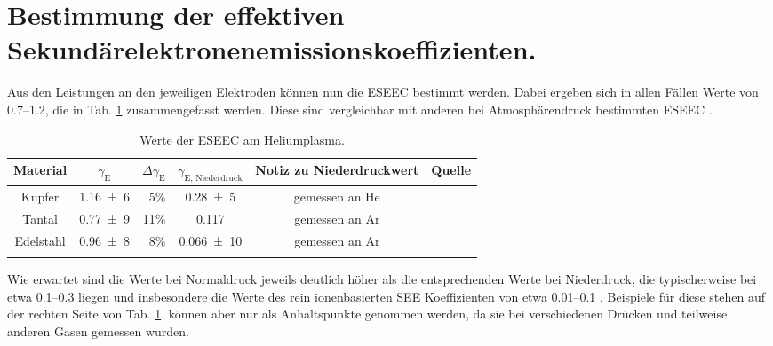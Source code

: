 \section{Bestimmung  der effektiven Sekundärelektronenemissionskoeffizienten.}

Aus den Leistungen an den jeweiligen Elektroden können nun die ESEEC bestimmt werden. Dabei ergeben sich in allen Fällen Werte von \numrange{0,7}{1,2}, die in Tab. \ref{tab:ESEEC} zusammengefasst werden. Diese sind vergleichbar mit anderen bei Atmosphärendruck bestimmten ESEEC \cite{hansenConventionalNonconventionalDiagnostics2022}. 

\begin{table}[thb]
	\centering
	\begin{tabular}{ccr|ccc}
		
		{Material} &{$ \gamma_\text{E} $}& \multicolumn{1}{l}{$ \Delta\gamma_\text{E} $} & {$ \gamma_\text{E, Niederdruck} $} & {Notiz zu Niederdruckwert} & {Quelle} \\
		\toprule
		
		{Kupfer}      & \num{1,16(6)} & 5\% & \num{0,28(5)} & gemessen an He & \cite{guntherschulzeElektronenablosungDurchStoss1930}  \\
		{Tantal}      & \num{0,77(9)} & 11\% & \num{0,117} & gemessen an Ar & \cite{oechsnerElectronYieldsClean1978} \\
		{Edelstahl}      & \num{0,96(8)} & 8\% & \num{0,066(10)} & gemessen an Ar & \cite{dakshaComputationallyAssistedSpectroscopic2016}  \\
		\addlinespace
		
	\end{tabular}
	
	\caption{Werte der ESEEC am Heliumplasma.}
	\label{tab:ESEEC}
\end{table}

Wie erwartet sind die Werte bei Normaldruck jeweils deutlich höher als die entsprechenden Werte bei Niederdruck, die typischerweise bei etwa \numrange{0,1}{0,3} liegen und insbesondere die Werte des rein ionenbasierten SEE Koeffizienten von etwa \numrange{0,01}{0,1}  \cite{liebermanPrinciplesPlasmaDischarges2005,haaseDynamicDeterminationSecondary2018,bohmRetardingfieldAnalyzerMeasurements1993,toliasSecondaryElectronEmission2014, marcakNoteIoninducedSecondary2015,dakshaComputationallyAssistedSpectroscopic2016,pamperinIoninducedSecondaryElectron2018,dakshaMaterialDependentModeling2019,oechsnerElectronYieldsClean1978,guntherschulzeElektronenablosungDurchStoss1930}. Beispiele für diese stehen auf der rechten Seite von Tab. \ref{tab:ESEEC}, können aber nur als Anhaltspunkte genommen werden, da sie bei verschiedenen Drücken und teilweise anderen Gasen gemessen wurden.

